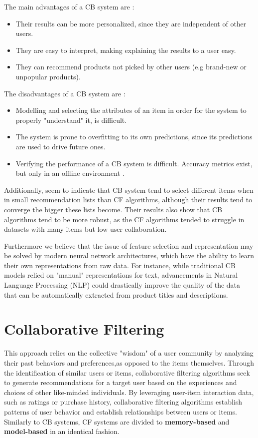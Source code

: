 \documentclass[12pt, a4paper]{article}
\begin{document}
The main advantages of a CB system are \cite{survey1, survey2}:
\begin{itemize}
    \item Their results can be more personalized, since they are independent of other users.
    \item They are easy to interpret, making explaining the results to a user easy.
    \item They can recommend products not picked by other users (e.g brand-new or unpopular products).
\end{itemize}

The disadvantages of a CB system are \cite{survey1, survey2}:
\begin{itemize}
    \item Modelling and selecting the attributes of an item in order for the system to properly "understand" it, is difficult.
    \item The system is prone to overfitting to its own predictions, since its predictions are used to drive future ones.
    \item Verifying the performance of a CB system is difficult. Accuracy metrics exist, but only in an offline environment \cite{comparison1, comparison2}.
\end{itemize}

Additionally, \textcite{comparison2} seem to indicate that CB system tend to select different items when in small recommendation lists than CF algorithms, although their results tend to converge the bigger these lists become. Their results also show that CB algorithms tend to be more robust, as the CF algorithms tended to struggle in datasets with many items but low user collaboration. 

Furthermore we believe that the issue of feature selection and representation may be solved by modern neural network architectures, which have the ability to learn their own representations from raw data. For instance, while traditional CB models relied on "manual" representations for text, advancements in Natural Language Processing (NLP) could drastically improve the quality of the data that can be automatically extracted from product titles and descriptions.


\section{Collaborative Filtering}

This approach relies on the collective "wisdom" of a user community by analyzing their past behaviors and preferences,as opposed to the items themselves. Through the identification of similar users or items, collaborative filtering algorithms seek to generate recommendations for a target user based on the experiences and choices of other like-minded individuals. By leveraging user-item interaction data, such as ratings or purchase history, collaborative filtering algorithms establish patterns of user behavior and establish relationships between users or items. Similarly to CB systems, CF systems are divided to \textbf{memory-based} and \textbf{model-based} in an identical fashion.
\end{document}
